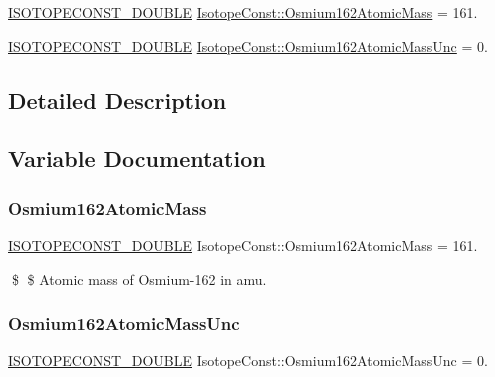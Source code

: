 \begin{DoxyCompactItemize}
\item 
\mbox{\hyperlink{group___isotope_const-_macros_ga8f45a7272ce02c0b4c65c44636ed719a}{I\+S\+O\+T\+O\+P\+E\+C\+O\+N\+S\+T\+\_\+\+D\+O\+U\+B\+LE}} \mbox{\hyperlink{group___isotope_const-_osmium-_os162_gaddd48c4c112b9fa5107e418191c19905}{Isotope\+Const\+::\+Osmium162\+Atomic\+Mass}} = 161.
\item 
\mbox{\hyperlink{group___isotope_const-_macros_ga8f45a7272ce02c0b4c65c44636ed719a}{I\+S\+O\+T\+O\+P\+E\+C\+O\+N\+S\+T\+\_\+\+D\+O\+U\+B\+LE}} \mbox{\hyperlink{group___isotope_const-_osmium-_os162_ga3752efba0b284c95552372cbe5657a63}{Isotope\+Const\+::\+Osmium162\+Atomic\+Mass\+Unc}} = 0.
\end{DoxyCompactItemize}


\subsection{Detailed Description}


\subsection{Variable Documentation}
\mbox{\label{group___isotope_const-_osmium-_os162_gaddd48c4c112b9fa5107e418191c19905}} 
\subsubsection{\texorpdfstring{Osmium162\+Atomic\+Mass}{Osmium162AtomicMass}}
{\footnotesize\ttfamily \mbox{\hyperlink{group___isotope_const-_macros_ga8f45a7272ce02c0b4c65c44636ed719a}{I\+S\+O\+T\+O\+P\+E\+C\+O\+N\+S\+T\+\_\+\+D\+O\+U\+B\+LE}} Isotope\+Const\+::\+Osmium162\+Atomic\+Mass = 161.}

\$ \$ Atomic mass of Osmium-\/162 in amu. \mbox{\label{group___isotope_const-_osmium-_os162_ga3752efba0b284c95552372cbe5657a63}} 
\subsubsection{\texorpdfstring{Osmium162\+Atomic\+Mass\+Unc}{Osmium162AtomicMassUnc}}
{\footnotesize\ttfamily \mbox{\hyperlink{group___isotope_const-_macros_ga8f45a7272ce02c0b4c65c44636ed719a}{I\+S\+O\+T\+O\+P\+E\+C\+O\+N\+S\+T\+\_\+\+D\+O\+U\+B\+LE}} Isotope\+Const\+::\+Osmium162\+Atomic\+Mass\+Unc = 0.}

